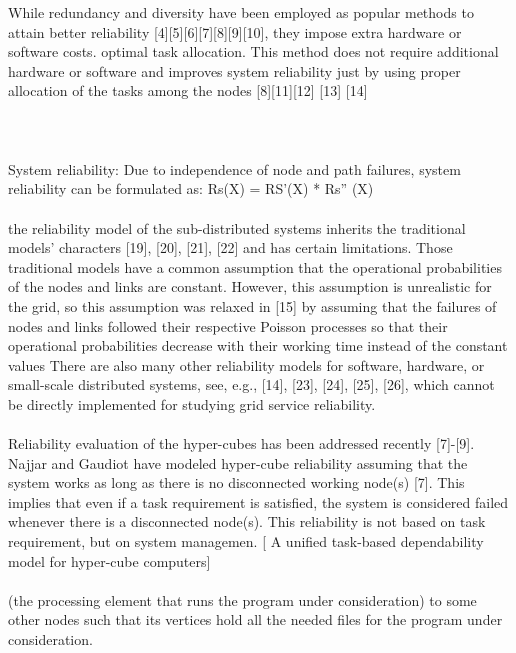 \documentclass{cslthse-msc}
\begin{document}
\iffalse
While redundancy and diversity have been employed as popular methods to attain better reliability [4][5][6][7][8][9][10], they impose extra hardware or software costs.
optimal task allocation. This method does not require additional hardware or software and improves system reliability just by using proper allocation of the tasks among the nodes [8][11][12] [13] [14] \cite{optTaskAllocationForMaxRel}
\\\\
\cite{discContRelModel}
\\\\
System reliability: Due to independence of node and path failures, system reliability can be formulated as: Rs(X) = RS’(X) * Rs” (X) \cite{optTaskAllocationForMaxRel}
\\\\
the reliability model of the sub-distributed systems inherits the traditional models’ characters [19], [20], [21], [22] and has certain limitations. Those traditional models have a common assumption that the operational probabilities of the nodes and links are constant. However, this assumption is unrealistic for the grid, so this assumption was relaxed in [15] by assuming that the failures of nodes and links followed their respective Poisson processes so that their operational probabilities decrease with their working time instead of the constant values 
There are also many other reliability models for software, hardware, or small-scale distributed systems, see, e.g., [14], [23], [24], [25], [26], which cannot be directly implemented for studying grid service reliability. \cite{hierarchicalRelModeling}
\\\\
Reliability evaluation of the hyper-cubes has been addressed recently [7]-[9]. Najjar and Gaudiot have modeled hyper-cube reliability assuming that the system works as long as there is no disconnected working node(s) [7]. This implies that even if a task requirement is satisfied, the system is considered failed whenever there is a disconnected node(s). This reliability is not based on task requirement, but on system managemen. [ A unified task-based dependability model for hyper-cube computers]
\\\\
(the processing element that runs the program under consideration) to some other nodes such that its vertices hold all the needed files for the program under consideration. \cite{relAnalysisFRA}
\\\\
\end{document}
